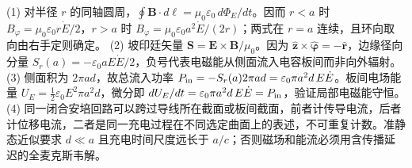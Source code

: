 (1) 对半径 \(r\) 的同轴圆周，\(\oint\mathbf B\cdot d\boldsymbol\ell=\mu_0\varepsilon_0\,d\Phi_E/dt\)。因而 \(r<a\) 时 \(B_\varphi=\mu_0\varepsilon_0r\dot E/2\)，\(r>a\) 时 \(B_\varphi=\mu_0\varepsilon_0a^2\dot E/(2r)\)；两式在 \(r=a\) 连续，且环向取向由右手定则确定。
(2) 坡印廷矢量 \(\mathbf S=\mathbf E\times\mathbf B/\mu_0\)。因为 \(\hat{\mathbf z}\times\hat{\boldsymbol\varphi}=-\hat{\mathbf r}\)，边缘径向分量 \(S_r(a)=-\varepsilon_0aE\dot E/2\)，负号代表电磁能从侧面流入电容板间而非向外辐射。
(3) 侧面积为 \(2\pi ad\)，故总流入功率 \(P_{\rm in}=-S_r(a)2\pi ad=\varepsilon_0\pi a^2d\,E\dot E\)。板间电场能量 \(U_E=\frac12\varepsilon_0E^2\pi a^2d\)，微分即 \(dU_E/dt=\varepsilon_0\pi a^2d\,E\dot E=P_{\rm in}\)，验证局部电磁能守恒。
(4) 同一闭合安培回路可以跨过导线所在截面或板间截面，前者计传导电流，后者计位移电流，二者是同一充电过程在不同选定曲面上的表述，不可重复计数。准静态近似要求 \(d\ll a\) 且充电时间尺度远长于 \(a/c\)；否则磁场和能流必须用含传播延迟的全麦克斯韦解。
